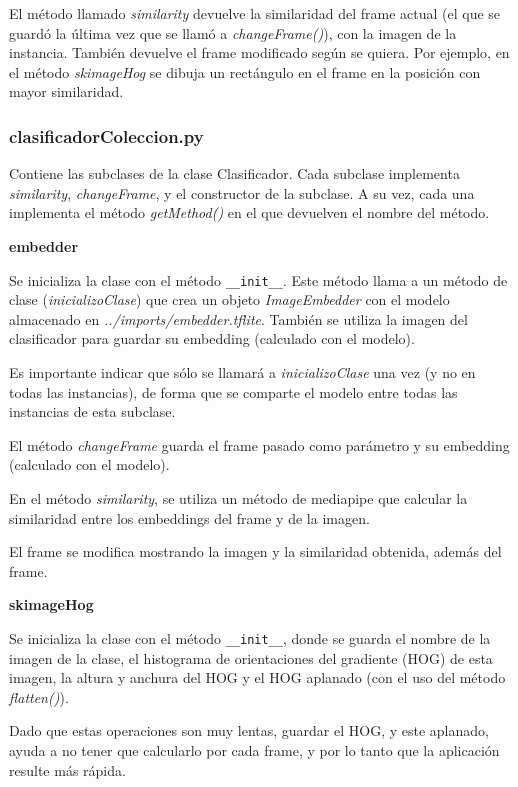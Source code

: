 \documentclass[12pt]{article}
\begin{document}
El método llamado \textit{similarity} devuelve la similaridad del frame actual (el que se guardó la última vez que se llamó a \textit{changeFrame()}), con la imagen de la instancia. También devuelve el frame modificado según se quiera. Por ejemplo, en el método \textit{skimageHog} se dibuja un rectángulo en el frame en la posición con mayor similaridad.

\subsubsection*{clasificadorColeccion.py}

Contiene las subclases de la clase Clasificador. Cada subclase implementa \textit{similarity}, \textit{changeFrame}, y el constructor de la subclase.
A su vez, cada una implementa el método \textit{getMethod()} en el que devuelven el nombre del método.

\textbf{embedder}

Se inicializa la clase con el método \texttt{\_\_init\_\_}. Este método llama a un método de clase (\textit{inicializoClase}) que crea un objeto \textit{ImageEmbedder} con el modelo almacenado en \textit{../imports/embedder.tflite}. También se utiliza la imagen del clasificador para guardar su embedding (calculado con el modelo).

Es importante indicar que sólo se llamará a \textit{inicializoClase} una vez (y no en todas las instancias), de forma que se comparte el modelo entre todas las instancias de esta subclase.

El método \textit{changeFrame} guarda el frame pasado como parámetro y su embedding (calculado con el modelo).

En el método \textit{similarity}, se utiliza un método de mediapipe que calcular la similaridad entre los embeddings del frame y de la imagen.

El frame se modifica mostrando la imagen y la similaridad obtenida, además del frame.

\textbf{skimageHog}

Se inicializa la clase con el método \texttt{\_\_init\_\_}, donde se guarda el nombre de la imagen de la clase, el histograma de orientaciones del gradiente (HOG) de esta imagen, la altura y anchura del HOG y el HOG aplanado (con el uso del método \textit{flatten()}). 

Dado que estas operaciones son muy lentas, guardar el HOG, y este aplanado, ayuda a no tener que calcularlo por cada frame, y por lo tanto que la aplicación resulte más rápida.
\end{document}
